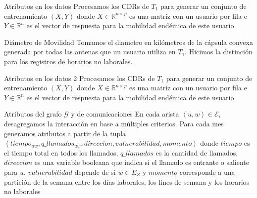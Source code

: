 \documentclass[xcolor=x11names]{beamer}
\def\calE{\mathcal{E}}
\def\calG{\mathcal{G}}
\begin{document}

\begin{frame}{Atributos en los datos}
	Procesamos los CDRs de $T_1$ para generar un conjunto de entrenamiento $(X,Y)$ donde $X \in \mathbb{R}^{n \times p}$ es una matriz con un usuario por fila e $Y \in \mathbb{R}^n$ es el vector de respuesta para la mobilidad endémica de este usuario

	\bigskip

	\begin{block}{Diámetro de Movilidad}
		Tomamos el diametro en kilómetros de la cápsula convexa generada por todas las antenas que un usuario utiliza en $T_1$. Hicimos la distinción para los registros de horarios no laborales.
	\end{block}

\end{frame}

\begin{frame}{Atributos en los datos 2}
	Procesamos los CDRs de $T_1$ para generar un conjunto de entrenamiento $(X,Y)$ donde $X \in \mathbb{R}^{n \times p}$ es una matriz con un usuario por fila e $Y \in \mathbb{R}^n$ es el vector de respuesta para la mobilidad endémica de este usuario

	\bigskip

	\begin{block}{Atributos del grafo $\calG$ y de comunicaciones}
		En cada arista $\left< u, w \right> \in \calE$, desagregamos la interacción en base a múltiples criterios. Para cada mes generamos atributos a partir de la tupla  $\left< tiempo_{uw}, q\_llamados_{uw}, direcci on, vulnerabilidad, momento \right>$ donde $tiempo$ es el tiempo total en todos los llamados, $q\_llamados$ es la cantidad de llamados, $direccion$ es una variable booleana que indica si el llamado es entrante o saliente para $u$, $vulnerabilidad$ depende de si $w \in E_Z$ y $momento$ corresponde a una partición de la semana entre los días laborales, los fines de semana y los horarios no laborales
	\end{block}

\end{frame}
\end{document}
